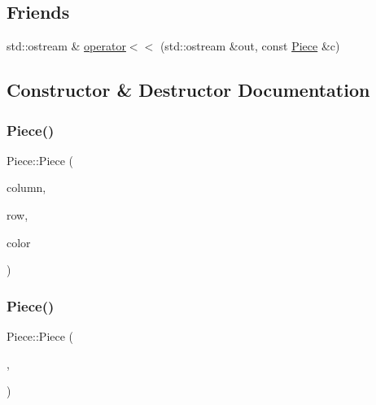 \subsection*{Friends}
\begin{DoxyCompactItemize}
\item 
std\+::ostream \& \hyperlink{class_piece_a2030184caa17f039eb2a026a6dbc7d23}{operator$<$$<$} (std\+::ostream \&out, const \hyperlink{class_piece}{Piece} \&c)
\end{DoxyCompactItemize}


\subsection{Constructor \& Destructor Documentation}
\mbox{\label{class_piece_a1ae0a039406ce1ca4eebc4465426bf25}} 
\subsubsection{\texorpdfstring{Piece()}{Piece()}\hspace{0.1cm}{\footnotesize\ttfamily [1/2]}}
{\footnotesize\ttfamily Piece\+::\+Piece (\begin{DoxyParamCaption}\item[{int}]{column,  }\item[{int}]{row,  }\item[{\hyperlink{_piece_8h_ad7595c48bb74c0dd2a7648712a2d4985}{Piece\+Color}}]{color }\end{DoxyParamCaption})}

\mbox{\label{class_piece_a98d2204a49a52df4cda971aa669e6796}} 
\subsubsection{\texorpdfstring{Piece()}{Piece()}\hspace{0.1cm}{\footnotesize\ttfamily [2/2]}}
{\footnotesize\ttfamily Piece\+::\+Piece (\begin{DoxyParamCaption}\item[{\hyperlink{struct_position}{Position}}]{,  }\item[{\hyperlink{_piece_8h_ad7595c48bb74c0dd2a7648712a2d4985}{Piece\+Color}}]{ }\end{DoxyParamCaption})\hspace{0.3cm}{\ttfamily [inline]}}



